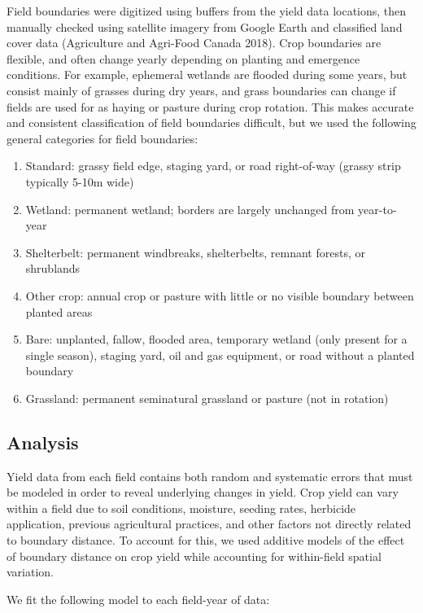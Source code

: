 \documentclass[]{elsarticle} %
\providecommand{\tightlist}{%
  \setlength{\itemsep}{0pt}\setlength{\parskip}{0pt}}
\begin{document}
Field boundaries were digitized using buffers from the yield data locations, then manually checked using satellite imagery from Google Earth and classified land cover data (Agriculture and Agri-Food Canada 2018).
Crop boundaries are flexible, and often change yearly depending on planting and emergence conditions.
For example, ephemeral wetlands are flooded during some years, but consist mainly of grasses during dry years, and grass boundaries can change if fields are used for as haying or pasture during crop rotation.
This makes accurate and consistent classification of field boundaries difficult, but we used the following general categories for field boundaries:

\begin{enumerate}
\def\labelenumi{\arabic{enumi}.}
\tightlist
\item
  Standard: grassy field edge, staging yard, or road right-of-way (grassy strip typically 5-10m wide)
\item
  Wetland: permanent wetland; borders are largely unchanged from year-to-year
\item
  Shelterbelt: permanent windbreaks, shelterbelts, remnant forests, or shrublands
\item
  Other crop: annual crop or pasture with little or no visible boundary between planted areas
\item
  Bare: unplanted, fallow, flooded area, temporary wetland (only present for a single season), staging yard, oil and gas equipment, or road without a planted boundary
\item
  Grassland: permanent seminatural grassland or pasture (not in rotation)
\end{enumerate}

\hypertarget{analysis}{%
\subsection{Analysis}\label{analysis}}

Yield data from each field contains both random and systematic errors that must be modeled in order to reveal underlying changes in yield.
Crop yield can vary within a field due to soil conditions, moisture, seeding rates, herbicide application, previous agricultural practices, and other factors not directly related to boundary distance.
To account for this, we used additive models of the effect of boundary distance on crop yield while accounting for within-field spatial variation.

We fit the following model to each field-year of data:
\end{document}
